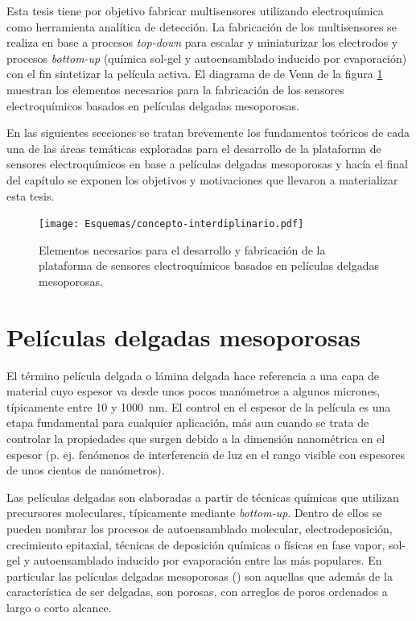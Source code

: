     	Esta tesis tiene por objetivo fabricar multisensores utilizando electroquímica como herramienta analítica de detección. La fabricación de los multisensores se realiza en base a procesos \textit{top-down} para escalar y miniaturizar los electrodos y procesos \textit{bottom-up} (química sol-gel y autoensamblado inducido por evaporación) con el fin sintetizar la película activa. El diagrama de  de Venn de la figura \ref{fig:sensores} muestran los elementos necesarios para la fabricación de los sensores electroquímicos basados en películas delgadas mesoporosas. 
	 	
 		En las siguientes secciones se tratan brevemente los fundamentos teóricos de cada una de las áreas temáticas exploradas para el desarrollo de la plataforma de sensores electroquímicos en base a películas delgadas mesoporosas y hacía el final del capítulo se exponen los objetivos y motivaciones que llevaron a materializar esta tesis.


	       \begin{figure}[ht!]
 				\begin{center}
 				\texttt{[image: Esquemas/concepto-interdiplinario.pdf]}
 				\caption[Plataforma de sensores. Diagrama de Venn.]{Elementos necesarios para el desarrollo y fabricación de la plataforma de sensores electroquímicos basados en películas delgadas mesoporosas.}
 		   		\label{fig:sensores}
 		    	\end{center}
 		    	\end{figure}

\section{Películas delgadas mesoporosas}\label{sec:mesoporosos}
	
	 El término película delgada o lámina delgada hace referencia a una capa de material cuyo espesor va desde unos pocos manómetros a algunos micrones, típicamente entre 10 y \SI{1000}{\nm}. El control en el espesor de la película es una etapa fundamental para cualquier aplicación, más aun cuando se trata de controlar la propiedades que surgen debido a la dimensión nanométrica en el espesor (p. ej. fenómenos de interferencia de luz en el rango visible con espesores de unos cientos de nanómetros). 

     Las películas delgadas son elaboradas a partir de técnicas químicas que utilizan precursores moleculares, típicamente mediante \textit{bottom-up}. Dentro de ellos se pueden nombrar los procesos de autoensamblado molecular, electrodeposición, crecimiento epitaxial, técnicas de deposición químicas o físicas en fase vapor, sol-gel y autoensamblado inducido por evaporación entre las más populares. En particular las películas delgadas mesoporosas (\pdm) son aquellas que además de la característica de ser delgadas, son porosas, con arreglos de poros ordenados a largo o corto alcance.

